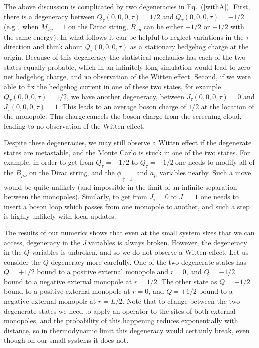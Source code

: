 \documentclass[prb,twocolumn]{revtex4-1}
\begin{document}
The above discussion is complicated by two degeneracies in Eq.~(\ref{withA}). First, there is a degeneracy between $Q_\tau(0,0,0,\tau)=1/2$ and $Q_\tau(0,0,0,\tau)=-1/2$. (e.g.,~when $M_{xy}=1$ on the Dirac string, $B_{xy}$ can be either $+1/2$ or $-1/2$ with the same energy). In what follows it can be helpful to neglect variations in the $\tau$ direction and think about $Q_\tau(0,0,0,\tau)$ as a stationary hedgehog charge at the origin. Because of this degeneracy the statistical mechanics has each of the two states equally probable, which in an infinitely long simulation would lead to zero net hedgehog charge, and no observation of the Witten effect.
Second, if we were able to fix the hedgehog current in one of these two states, for example $Q_\tau(0,0,0,\tau) = 1/2$, we have another degeneracy, between $J_\tau(0,0,0,\tau) = 0$ and $J_\tau(0,0,0,\tau) = 1$. This leads to an average boson charge of $1/2$ at the location of the  monopole. This charge cancels the boson charge from the screening cloud, leading to no observation of the Witten effect. 

Despite these degeneracies, we may still observe a Witten effect if the degenerate states are metastable, and the Monte Carlo is stuck in one of the two states. For example, in order to get from $Q_\tau=+1/2$ to $Q_\tau=-1/2$ one needs to modify all of the $B_{\mu\nu}$ on the Dirac string, and the $\phi_{\uparrow,\downarrow}$ and $a_{\mu}$ variables nearby. Such a move would be quite unlikely (and impossible in the limit of an infinite separation between the monopoles). Similarly, to get from $J_\tau=0$ to $J_\tau=1$ one needs to insert a boson loop which passes from one monopole to another, and such a step is highly unlikely with local updates.

The results of our numerics shows that even at the small system sizes that we can access, degeneracy in the $J$ variables is always broken. However, the degeneracy in the $Q$ variables is unbroken, and so we do not observe a Witten effect. Let us consider the $Q$ degeneracy more carefully. One of the two degenerate states has $Q=+1/2$ bound to a positive external monopole and $r=0$, and $Q=-1/2$ bound to a negative external monopole at $r=1/2$. The other state as $Q=-1/2$ bound to a positive external monopole at $r=0$, and $Q=+1/2$ bound to a negative external monopole at $r=L/2$. Note that to change between the two degenerate states we need to apply an operator to the sites of both external monopoles, and the probability of this happening reduces exponentially with distance, so in thermodynamic limit this degeneracy would certainly break, even though on our small systems it does not. 
\end{document}
